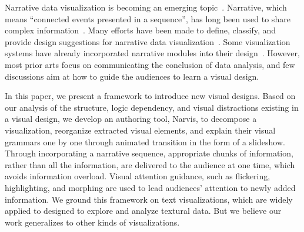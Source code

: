 


Narrative data visualization is becoming an emerging topic~\cite{kosara_storytelling:_2013}. 
Narrative, which means ``connected events presented in a sequence'', has long been used to share complex information~\cite{schmidt_living_2017}. 
Many efforts have been made to define, classify, and provide design suggestions for narrative data visualization~\cite{segel_narrative_2010,hullman_deeper_2013,gershon_what_2001}. Some visualization systems have already incorporated narrative modules into their design~\cite{eccles_stories_2007,bryan_temporal_2016}. However, most prior arts focus on communicating the conclusion of data analysis, and few discussions aim at how to guide the audiences to learn a visual design. 

In this paper, we present a framework to introduce new visual designs. Based on our analysis of the structure, logic dependency, and visual distractions existing in a visual design, we develop an authoring tool, Narvis, to decompose a visualization, reorganize extracted visual elements, and explain their visual grammars one by one through animated transition in the form of a slideshow. Through incorporating a narrative sequence, appropriate chunks of information, rather than all the information, are delivered to the audience at one time, which avoids information overload. Visual attention guidance, such as flickering, highlighting, and morphing are used to lead audiences' attention to newly added information. We ground this framework on text visualizations, which are widely applied to designed to explore and analyze textural data. But we believe our work generalizes to other kinds of visualizations. 

